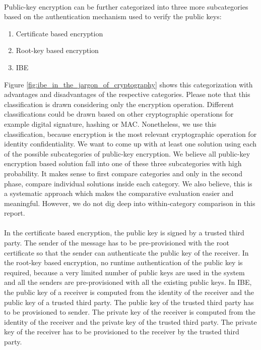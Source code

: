\documentclass[lnicst,sechang,a4paper]{svmultln}
\begin{document}
\paragraph{}
Public-key encryption can be further categorized into three more subcategories based on the authentication mechanism used to verify the public keys:
\begin{enumerate}
\item Certificate based encryption
\item Root-key based encryption
\item IBE
\end{enumerate} 
Figure \ref{fig:ibe_in_the_jargon_of_cryptography} shows this categorization with advantages and disadvantages of the respective categories. Please note that this classification is drawn considering only the encryption operation. Different classifications could be drawn based on other cryptographic operations for example digital signature, hashing or MAC. Nonetheless, we use this classification, because encryption is the most relevant cryptographic operation for identity confidentiality. We want to come up with at least one solution using each of the possible subcategories of public-key encryption. We believe all public-key encryption based solution fall into one of these three subcategories with high probability. It makes sense to first compare categories and only in the second phase, compare individual solutions inside each category. We also believe, this is a systematic approach which makes the comparative evaluation easier and meaningful.
However, we do not dig deep into within-category comparison in this report.
\paragraph{}
In the certificate based encryption, the public key is signed by a trusted third party. The sender of the message has to be pre-provisioned with the root certificate so that the sender can authenticate the public key of the receiver. In the root-key based encryption, no runtime authentication of the public key is required, because a very limited number of public keys are used in the system and all the senders are pre-provisioned with all the existing public keys. In IBE, the public key of a receiver is computed from the identity of the receiver and the public key of a trusted third party. The public key of the trusted third party has to be provisioned to sender. The private key of the receiver is computed from the identity of the receiver and the private key of the trusted third party. The private key of the receiver has to be provisioned to the receiver by the trusted third party.
\end{document}
